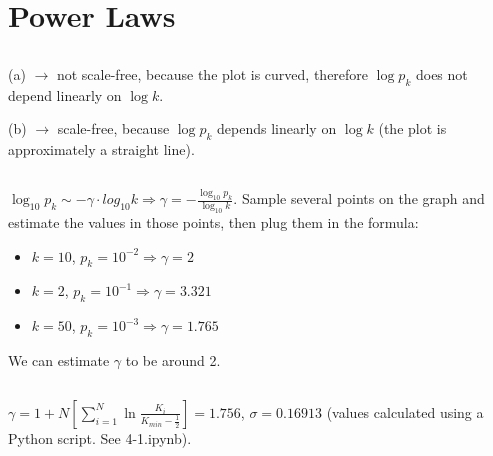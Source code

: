 \documentclass {article}
\begin{document}
\section{Power Laws}

\subsection{}
(a) $ \to $ not scale-free, because the plot is curved, therefore $ \log p_k $ does not depend linearly on $ \log k $.

(b) $ \to $ scale-free, because $ \log p_k $ depends linearly on $ \log k $ (the plot is approximately a straight line).

\subsection{}
$ \log_{10} p_k \sim - \gamma \cdot log_{10} k \Rightarrow
  \gamma = - \frac{ \log_{10} p_k }{ \log_{10} k } $. 
Sample several points on the graph and estimate the values in those points, then plug them in the formula:

\begin{itemize}
  \item $ k = 10 $, $ p_k = 10^{-2} \Rightarrow \gamma = 2 $
  \item $ k = 2  $, $ p_k = 10^{-1} \Rightarrow \gamma = 3.321 $
  \item $ k = 50 $, $ p_k = 10^{-3} \Rightarrow \gamma = 1.765 $
\end{itemize}

We can estimate $ \gamma $ to be around 2.

\subsection{}
$ \gamma = 1 + N[\sum^N_{i=1} \ln \frac{ K_i }{ K_{min}-\frac{1}{2} }] = 1.756 $, $ \sigma = 0.16913 $ (values calculated using a Python script. See 4-1.ipynb).

\newpage
\end{document}
